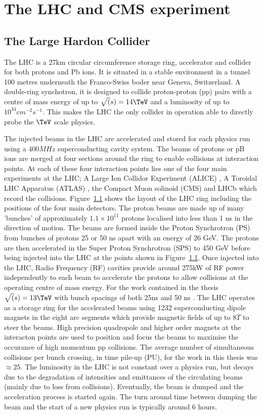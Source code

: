 
\chapter{The LHC and CMS experiment} %
\section{The Large Hardon Collider}
The LHC is a 27km circular circumference storage ring, accelerator and collider for 
both protons and Pb ions. It is situated in a stable environment in a tunnel 
100 metres underneath the Franco-Swiss boder near Geneva, Switzerland.
A double-ring synchotron, it is designed to collide proton-proton (pp)
pairs with a centre of mass energy of up to $\sqrt(s)=14\TeV$ and a 
luminosity of up to $10^{34}cm^{-2}s^{-1}$. This makes the LHC the only collider
in operation able to directly probe the $\TeV$ scale physics. 

The injected beams in the LHC are accelerated and stored for each physics run using 
a $400MHz$ superconducting cavity system. The beams of protons or pB ions 
are merged at four sections around the ring to enable collisions at interaction points.
At each of these four interaction points lies one of the four main 
experiments at the LHC; A Large Ion Collidor Experiment (ALICE) \cite{ALICE},
A Toroidal LHC Apparatus (ATLAS) \cite{ATLAS}, the Compact Muon solinoid (CMS) \cite{CMS}
and LHCb which record the collisions. Figure~\ref{} shows the layout of the LHC ring including
the positions of the four main detectors. The proton beams are made up of many 'bunches' of approximately $1.1\times10^{11}$
protons localised into less than 1 ns in the direction of motion.
The beams are formed inside the Proton Synchrotron (PS) from bunches of protons 25 or 50 ns apart with an energy of 26 GeV. 
The protons are then accelerated in the Super Proton Synchrotron (SPS) to 450 GeV before being injected into the LHC at
the points shown in Figure~\ref{}. Once injected into the LHC, Radio Frequency (RF) cavities 
provide around 275kW of RF power independently to each beam to accelerate the protons to allow collisions
at the operating centre of mass energy. For the work contained in the thesis $\sqrt(s) = 13\TeV$ with bunch spacings of both
25ns and 50 ns \cite{LHC}. The LHC operates as a storage ring for the accelerated beams using 1232 
superconducting dipole magnets in the eight arc segments which provide magnetic fields of up to $8T$ to steer the beams. 
High precision quadropole and higher order magnets at the interacton points are used to position and focus the beams to 
maximise the occurance of high momentum pp collisions. The average number of simultaneous collisions
per bunch crossing, in time pile-up (PU), for the work in this thesis was $\approx25$.
The luminosity in the LHC is not constant over a physics run, but decays due to the degradation 
of intensities and emittances of the circulating beams (mainly due to loss from collisions). Eventually,
the beam is dumped and the acceleration process is started again. The turn around time between dumping
the beam and the start of a new physics run is typically around 6 hours.

